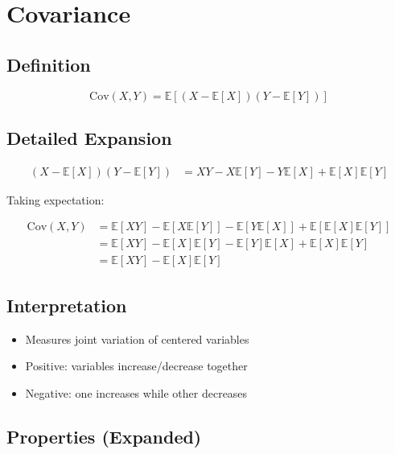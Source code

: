 \documentclass[12pt]{article}
\begin{document}
\section{Covariance}

\subsection{Definition}

\[
\text{Cov}(X,Y) = \mathbb{E}[(X - \mathbb{E}[X])(Y - \mathbb{E}[Y])]
\]

\subsection{Detailed Expansion}

\begin{align*}
(X - \mathbb{E}[X])(Y - \mathbb{E}[Y]) 
&= XY - X\mathbb{E}[Y] - Y\mathbb{E}[X] + \mathbb{E}[X]\mathbb{E}[Y]
\end{align*}

Taking expectation:

\begin{align*}
\text{Cov}(X,Y) 
&= \mathbb{E}[XY] - \mathbb{E}[X\mathbb{E}[Y]] - \mathbb{E}[Y\mathbb{E}[X]] + \mathbb{E}[\mathbb{E}[X]\mathbb{E}[Y]] \\
&= \mathbb{E}[XY] - \mathbb{E}[X]\mathbb{E}[Y] - \mathbb{E}[Y]\mathbb{E}[X] + \mathbb{E}[X]\mathbb{E}[Y] \\
&= \mathbb{E}[XY] - \mathbb{E}[X]\mathbb{E}[Y]
\end{align*}

\subsection{Interpretation}

\begin{itemize}
    \item Measures joint variation of centered variables
    \item Positive: variables increase/decrease together
    \item Negative: one increases while other decreases
\end{itemize}

\subsection{Properties (Expanded)}
\end{document}
